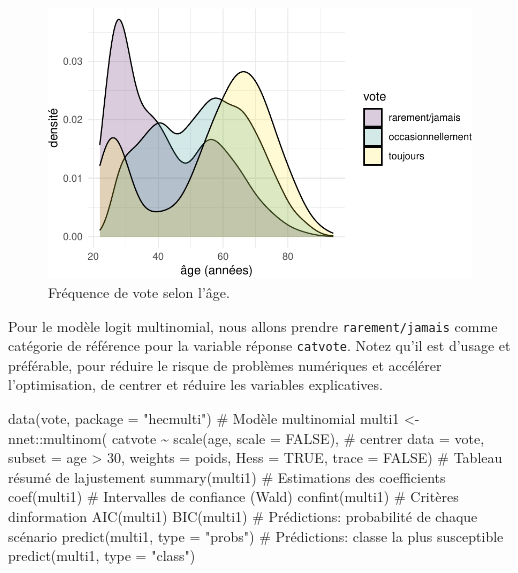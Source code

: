 \documentclass[
  11pt,
  letterpaper,
]{book}
\newenvironment{Shaded}{\begin{snugshade}}{\end{snugshade}}
\newcommand{\AttributeTok}[1]{\textcolor[rgb]{0.40,0.45,0.13}{#1}}
\newcommand{\CommentTok}[1]{\textcolor[rgb]{0.37,0.37,0.37}{#1}}
\newcommand{\ConstantTok}[1]{\textcolor[rgb]{0.56,0.35,0.01}{#1}}
\newcommand{\DecValTok}[1]{\textcolor[rgb]{0.68,0.00,0.00}{#1}}
\newcommand{\FunctionTok}[1]{\textcolor[rgb]{0.28,0.35,0.67}{#1}}
\newcommand{\NormalTok}[1]{\textcolor[rgb]{0.00,0.23,0.31}{#1}}
\newcommand{\OtherTok}[1]{\textcolor[rgb]{0.00,0.23,0.31}{#1}}
\newcommand{\SpecialCharTok}[1]{\textcolor[rgb]{0.37,0.37,0.37}{#1}}
\newcommand{\StringTok}[1]{\textcolor[rgb]{0.13,0.47,0.30}{#1}}
\theoremstyle{definition}
\theoremstyle{remark}
\begin{document}
\begin{figure}[ht!]

{\centering \includegraphics{./05-reglogistique_files/figure-pdf/fig-vote-age-1.pdf}

}

\caption{\label{fig-vote-age}Fréquence de vote selon l'âge.}

\end{figure}

Pour le modèle logit multinomial, nous allons prendre
\texttt{rarement/jamais} comme catégorie de référence pour la variable
réponse \texttt{catvote}. Notez qu'il est d'usage et préférable, pour
réduire le risque de problèmes numériques et accélérer l'optimisation,
de centrer et réduire les variables explicatives.

\begin{Shaded}
\begin{Highlighting}[]
\FunctionTok{data}\NormalTok{(vote, }\AttributeTok{package =} \StringTok{"hecmulti"}\NormalTok{)}
\CommentTok{\# Modèle multinomial}
\NormalTok{multi1 }\OtherTok{\textless{}{-}}\NormalTok{ nnet}\SpecialCharTok{::}\FunctionTok{multinom}\NormalTok{(}
\NormalTok{  catvote }\SpecialCharTok{\textasciitilde{}} \FunctionTok{scale}\NormalTok{(age, }\AttributeTok{scale =} \ConstantTok{FALSE}\NormalTok{), }\CommentTok{\# centrer}
  \AttributeTok{data =}\NormalTok{ vote, }
  \AttributeTok{subset =}\NormalTok{ age }\SpecialCharTok{\textgreater{}} \DecValTok{30}\NormalTok{,}
  \AttributeTok{weights =}\NormalTok{ poids,}
  \AttributeTok{Hess =} \ConstantTok{TRUE}\NormalTok{,}
  \AttributeTok{trace =} \ConstantTok{FALSE}\NormalTok{) }
\CommentTok{\# Tableau résumé de l\textquotesingle{}ajustement}
\FunctionTok{summary}\NormalTok{(multi1)}
\CommentTok{\# Estimations des coefficients}
\FunctionTok{coef}\NormalTok{(multi1)}
\CommentTok{\# Intervalles de confiance (Wald)}
\FunctionTok{confint}\NormalTok{(multi1)}
\CommentTok{\# Critères d\textquotesingle{}information}
\FunctionTok{AIC}\NormalTok{(multi1)}
\FunctionTok{BIC}\NormalTok{(multi1)}
\CommentTok{\# Prédictions: probabilité de chaque scénario}
\FunctionTok{predict}\NormalTok{(multi1, }\AttributeTok{type =} \StringTok{"probs"}\NormalTok{)}
\CommentTok{\# Prédictions: classe la plus susceptible}
\FunctionTok{predict}\NormalTok{(multi1, }\AttributeTok{type =} \StringTok{"class"}\NormalTok{)}
\end{Highlighting}
\end{Shaded}
\end{document}
